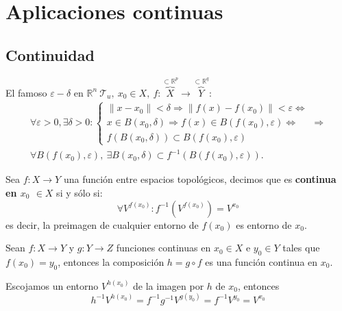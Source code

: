 \chapter{Aplicaciones continuas}%
\label{cha:aplicaciones_continuas}


\section{Continuidad}%
\label{sec:continuidad}
El famoso $\varepsilon-\delta$ en $\mathbb{R}^n\ \mathcal{T}_u,\ x_0 \in X,\ f : \overbrace{X}^{\subset \mathbb{R}^p} \rightarrow \overbrace{Y}^{\subset \mathbb{R}^q}$: 
\begin{gather*}        
\forall \varepsilon > 0, \exists \delta > 0: 
\begin{cases}
    \lVert x - x_0 \rVert < \delta \Rightarrow \lVert f\left( x \right) - f\left( x_0 \right) \rVert < \varepsilon \Leftrightarrow\\
    x \in B\left( x_0, \delta \right) \Rightarrow f\left( x \right) \in B\left( f\left( x_0 \right), \varepsilon \right) \Leftrightarrow\\
    f\left( B\left( x_0, \delta \right) \right) \subset B\left( f\left( x_0 \right), \varepsilon \right) 
\end{cases} \Rightarrow\\
\boxed{\forall B\left( f\left( x_0 \right), \varepsilon \right),\ \exists B\left( x_0, \delta \right) \subset f^{-1}\left( B\left( f\left( x_0 \right), \varepsilon \right) \right)} 
.\end{gather*}

\begin{defi}[Continuidad]
Sea $f: X \rightarrow Y$ una función entre espacios topológicos, decimos que es \textbf{continua en $x_0$ $\in X$} si y sólo si:
\[
\forall V^{f\left( x_0 \right)} :  f^{-1}\left( V^{f\left( x_0 \right)} \right) = V^{x_0} 
\]
es decir, la preimagen de cualquier entorno de $f(x_0)$ es entorno de $x_0$.
\end{defi}

\begin{prop}
Sean $f:X \rightarrow Y$ y $g: Y \rightarrow Z$ funciones continuas en $x_0\in X$ e $y_0\in Y$ tales que $f(x_0) = y_0$, entonces la composición $h = g \circ f$ es una función continua en $x_0$.
\end{prop}
\begin{demo}
Escojamos un entorno $V^{h\left( x_0 \right)}$ de la imagen por $h$ de $x_0$, entonces
\[
h^{-1} V^{h\left( x_0 \right)} = f^{-1}g^{-1}V^{g\left( y_0 \right)} = f^{-1} V^{y_0} = V^{x_0}
\]
\end{demo}

